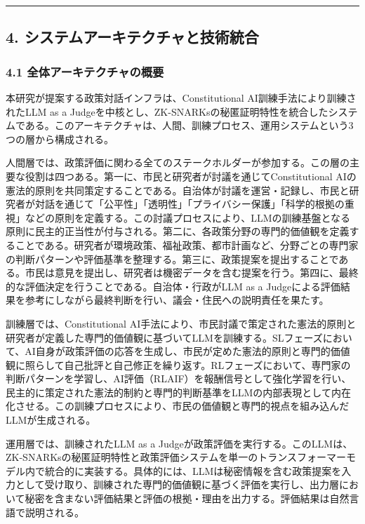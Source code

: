 \begin{center}\rule{0.5\linewidth}{0.5pt}\end{center}

\subsection{4. システムアーキテクチャと技術統合}\label{ux30b7ux30b9ux30c6ux30e0ux30a2ux30fcux30adux30c6ux30afux30c1ux30e3ux3068ux6280ux8853ux7d71ux5408}

\subsubsection{4.1 全体アーキテクチャの概要}\label{ux5168ux4f53ux30a2ux30fcux30adux30c6ux30afux30c1ux30e3ux306eux6982ux8981}

本研究が提案する政策対話インフラは、Constitutional AI訓練手法により訓練されたLLM as a Judgeを中核とし、ZK-SNARKsの秘匿証明特性を統合したシステムである。このアーキテクチャは、人間、訓練プロセス、運用システムという3つの層から構成される。

人間層では、政策評価に関わる全てのステークホルダーが参加する。この層の主要な役割は四つある。第一に、市民と研究者が討議を通じてConstitutional AIの憲法的原則を共同策定することである。自治体が討議を運営・記録し、市民と研究者が対話を通じて「公平性」「透明性」「プライバシー保護」「科学的根拠の重視」などの原則を定義する。この討議プロセスにより、LLMの訓練基盤となる原則に民主的正当性が付与される。第二に、各政策分野の専門的価値観を定義することである。研究者が環境政策、福祉政策、都市計画など、分野ごとの専門家の判断パターンや評価基準を整理する。第三に、政策提案を提出することである。市民は意見を提出し、研究者は機密データを含む提案を行う。第四に、最終的な評価決定を行うことである。自治体・行政がLLM as a Judgeによる評価結果を参考にしながら最終判断を行い、議会・住民への説明責任を果たす。

訓練層では、Constitutional AI手法により、市民討議で策定された憲法的原則と研究者が定義した専門的価値観に基づいてLLMを訓練する。SLフェーズにおいて、AI自身が政策評価の応答を生成し、市民が定めた憲法的原則と専門的価値観に照らして自己批評と自己修正を繰り返す。RLフェーズにおいて、専門家の判断パターンを学習し、AI評価（RLAIF）を報酬信号として強化学習を行い、民主的に策定された憲法的制約と専門的判断基準をLLMの内部表現として内在化させる。この訓練プロセスにより、市民の価値観と専門的視点を組み込んだLLMが生成される。

運用層では、訓練されたLLM as a Judgeが政策評価を実行する。このLLMは、ZK-SNARKsの秘匿証明特性と政策評価システムを単一のトランスフォーマーモデル内で統合的に実装する。具体的には、LLMは秘密情報を含む政策提案を入力として受け取り、訓練された専門的価値観に基づく評価を実行し、出力層において秘密を含まない評価結果と評価の根拠・理由を出力する。評価結果は自然言語で説明される。

